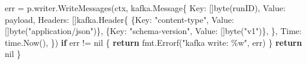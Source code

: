 \documentclass[
]{article}
\newenvironment{Shaded}{}{}
\newcommand{\ControlFlowTok}[1]{\textcolor[rgb]{0.00,0.44,0.13}{\textbf{#1}}}
\newcommand{\DataTypeTok}[1]{\textcolor[rgb]{0.56,0.13,0.00}{#1}}
\newcommand{\NormalTok}[1]{#1}
\newcommand{\OperatorTok}[1]{\textcolor[rgb]{0.40,0.40,0.40}{#1}}
\newcommand{\OtherTok}[1]{\textcolor[rgb]{0.00,0.44,0.13}{#1}}
\newcommand{\StringTok}[1]{\textcolor[rgb]{0.25,0.44,0.63}{#1}}
\begin{document}
\begin{Shaded}
\begin{Highlighting}[]
\NormalTok{    err }\OperatorTok{=}\NormalTok{ p}\OperatorTok{.}\NormalTok{writer}\OperatorTok{.}\NormalTok{WriteMessages}\OperatorTok{(}\NormalTok{ctx}\OperatorTok{,}\NormalTok{ kafka}\OperatorTok{.}\NormalTok{Message}\OperatorTok{\{}
\NormalTok{        Key}\OperatorTok{:}   \OperatorTok{[]}\DataTypeTok{byte}\OperatorTok{(}\NormalTok{runID}\OperatorTok{),}
\NormalTok{        Value}\OperatorTok{:}\NormalTok{ payload}\OperatorTok{,}
\NormalTok{        Headers}\OperatorTok{:} \OperatorTok{[]}\NormalTok{kafka}\OperatorTok{.}\NormalTok{Header}\OperatorTok{\{}
            \OperatorTok{\{}\NormalTok{Key}\OperatorTok{:} \StringTok{"content{-}type"}\OperatorTok{,}\NormalTok{ Value}\OperatorTok{:} \OperatorTok{[]}\DataTypeTok{byte}\OperatorTok{(}\StringTok{"application/json"}\OperatorTok{)\},}
            \OperatorTok{\{}\NormalTok{Key}\OperatorTok{:} \StringTok{"schema{-}version"}\OperatorTok{,}\NormalTok{ Value}\OperatorTok{:} \OperatorTok{[]}\DataTypeTok{byte}\OperatorTok{(}\StringTok{"v1"}\OperatorTok{)\},}
        \OperatorTok{\},}
\NormalTok{        Time}\OperatorTok{:}\NormalTok{ time}\OperatorTok{.}\NormalTok{Now}\OperatorTok{(),}
    \OperatorTok{\})}
    \ControlFlowTok{if}\NormalTok{ err }\OperatorTok{!=} \OtherTok{nil} \OperatorTok{\{}
        \ControlFlowTok{return}\NormalTok{ fmt}\OperatorTok{.}\NormalTok{Errorf}\OperatorTok{(}\StringTok{"kafka write: \%w"}\OperatorTok{,}\NormalTok{ err}\OperatorTok{)}
    \OperatorTok{\}}
    \ControlFlowTok{return} \OtherTok{nil}
\OperatorTok{\}}


\end{Highlighting}
\end{Shaded}
\end{document}
